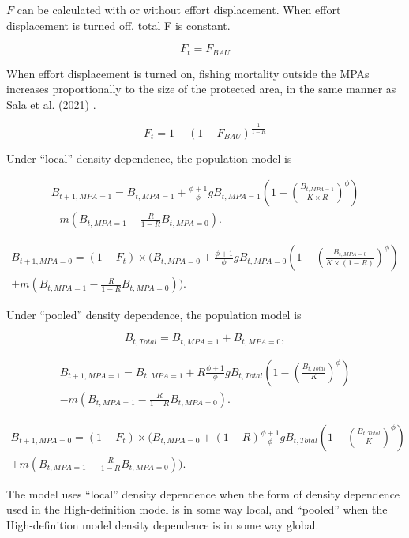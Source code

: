 \documentclass[
  default,
  lineno,
  referee]{sn-jnl}
\begin{document}
\(F\) can be calculated with or without effort displacement. When effort
displacement is turned off, total F is constant.

\[F_t = F_{BAU}\]

When effort displacement is turned on, fishing mortality outside the
MPAs increases proportionally to the size of the protected area, in the
same manner as Sala et al. (2021) .

\[F_t = 1 - (1 - F_{BAU})^{\frac{1}{1 - R}}\]

Under ``local'' density dependence, the population model is

\[
\begin{aligned}
B_{t+1,MPA = 1} = B_{t,MPA = 1} + \frac{\phi + 1}{\phi}gB_{t,MPA = 1} \left(1 - \left(\frac{B_{t,MPA = 1}}{K \times R}\right)^{\phi} \right) \\ - m(B_{t,MPA = 1} - \frac{R}{1 - R}B_{t,MPA = 0}).
\end{aligned}
\]

\[
\begin{aligned}
B_{t+1,MPA = 0} = (1 - F_{t}) \times ( B_{t,MPA = 0} + \frac{\phi + 1}{\phi}gB_{t,MPA = 0} \left(1 - \left(\frac{B_{t,MPA = 0}}{K \times (1 - R)}\right)^{\phi} \right) \\ +  m\left(B_{t,MPA = 1} - \frac{R}{1 - R}B_{t,MPA= 0}\right) ).
\end{aligned}
\]

Under ``pooled'' density dependence, the population model is

\[B_{t,Total} = B_{t,MPA = 1} + B_{t,MPA = 0},\]

\[
\begin{aligned}
B_{t+1,MPA = 1} = B_{t,MPA = 1} + R \frac{\phi + 1}{\phi}gB_{t,Total} \left(1 - \left(\frac{B_{t,Total}}{K}\right)^{\phi} \right) \\ -  m\left(B_{t,MPA = 1} - \frac{R}{1 - R}B_{t,MPA=0}\right).
\end{aligned}
\]

\[
\begin{aligned}
B_{t+1,MPA = 0} = (1 - F_{t}) \times ( B_{t,MPA = 0} + (1 - R) \frac{\phi + 1}{\phi}gB_{t,Total} \left(1 - \left(\frac{B_{t,Total}}{K}\right)^{\phi} \right) \\ +  m\left(B_{t,MPA = 1} - \frac{R}{1 - R}B_{t,MPA=0}\right) ).
\end{aligned}
\]

The model uses ``local'' density dependence when the form of density
dependence used in the High-definition model is in some way local, and
``pooled'' when the High-definition model density dependence is in some
way global.
\end{document}
